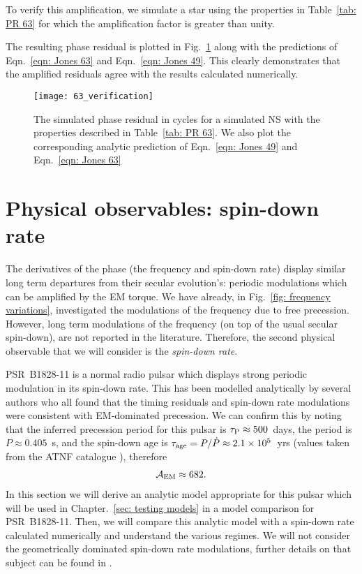 \documentclass[../full_thesis/full_thesis.tex]{subfiles}
\begin{document}
To verify this amplification, we simulate a star using the properties in
Table~\ref{tab: PR 63} for which the amplification factor is greater than
unity.
\begin{table}
\centering

\caption{Simulation parameters used for the phase residual plotted in Fig.~\ref{fig: PR 63}}
\label{tab: PR 63}
\end{table}
The resulting phase residual is plotted in Fig.~\ref{fig: PR 63} along with the
predictions of Eqn.~\eqref{eqn: Jones 63} and Eqn.~\eqref{eqn: Jones 49}. This
clearly demonstrates that the amplified residuals agree with the results
calculated numerically.
\begin{figure}[htb]
\centering
\texttt{[image: 63\_verification]}
\caption{The simulated phase residual in cycles for a simulated NS with the
properties described in Table~\ref{tab: PR 63}. We also plot the corresponding
analytic prediction of Eqn.~\eqref{eqn: Jones 49} and Eqn.~\eqref{eqn: Jones 63}}
\label{fig: PR 63}
\end{figure}

\section{Physical observables: spin-down rate}

The derivatives of the phase (the frequency and spin-down rate) display similar
long term departures from their secular evolution's: periodic modulations which
can be amplified by the EM torque.  We have already, in Fig.~\ref{fig:
frequency variations}, investigated the modulations of the frequency due to
free precession. However, long term modulations of the frequency (on top of the
usual secular spin-down), are not reported in the literature. Therefore, the
second physical observable that we will consider is the \emph{spin-down rate}.

PSR~B1828-11 is a normal radio pulsar which displays strong periodic modulation
in its spin-down rate. This has been modelled analytically by several authors
\citep{Stairs2000, Jones2001, Link2001, Akgun2006} who all found that the timing
residuals and spin-down rate modulations were consistent with EM-dominated
precession. We can confirm this by noting that the inferred precession period for this
pulsar is $\tau_{\mathrm{P}} \approx 500$~days, the period is $P\approx0.405$~s, and
the spin-down age is $\tau_{\mathrm{age}} = P/\dot{P} \approx 2.1 \times10^{5}$~yrs (values
taken from the ATNF catalogue \citet{ATNF}), therefore
\begin{align}
\mathcal{A}_{\mathrm{EM}} \approx 682.
\end{align}
In this section we will derive an analytic model appropriate for this pulsar
which will be used in Chapter.~\ref{sec: testing models} in a model comparison
for PSR~B1828-11. Then, we will compare this analytic model with a spin-down
rate calculated numerically and understand the various regimes. We will not
consider the geometrically dominated spin-down rate modulations, further
details on that subject can be found in \citet{Jones2001}.
\end{document}
